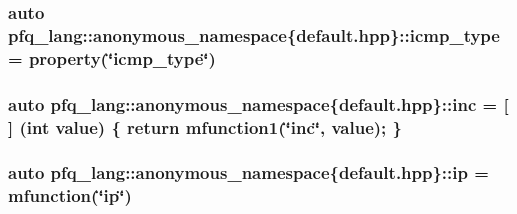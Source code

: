 \hypertarget{namespacepfq__lang_1_1anonymous__namespace_02default_8hpp_03_a4adff7ced08caa2d0016a911dae6d2ed}{
\subsubsection[{icmp\+\_\+type}]{\setlength{\rightskip}{0pt plus 5cm}auto pfq\+\_\+lang\+::anonymous\+\_\+namespace\{default.\+hpp\}\+::icmp\+\_\+type = {\bf property}(\char`\"{}icmp\+\_\+type\char`\"{})}}\label{namespacepfq__lang_1_1anonymous__namespace_02default_8hpp_03_a4adff7ced08caa2d0016a911dae6d2ed}
\hypertarget{namespacepfq__lang_1_1anonymous__namespace_02default_8hpp_03_a14246183085ec07f08ab9b0d53907ae5}{
\subsubsection[{inc}]{\setlength{\rightskip}{0pt plus 5cm}auto pfq\+\_\+lang\+::anonymous\+\_\+namespace\{default.\+hpp\}\+::inc = \mbox{[}$\,$\mbox{]} (int value) \{ return {\bf mfunction1}(\char`\"{}inc\char`\"{}, value); \}}}\label{namespacepfq__lang_1_1anonymous__namespace_02default_8hpp_03_a14246183085ec07f08ab9b0d53907ae5}
\hypertarget{namespacepfq__lang_1_1anonymous__namespace_02default_8hpp_03_a27d30e7744c84a7cdc41a710ee16b885}{
\subsubsection[{ip}]{\setlength{\rightskip}{0pt plus 5cm}auto pfq\+\_\+lang\+::anonymous\+\_\+namespace\{default.\+hpp\}\+::ip = {\bf mfunction}(\char`\"{}ip\char`\"{})}}\label{namespacepfq__lang_1_1anonymous__namespace_02default_8hpp_03_a27d30e7744c84a7cdc41a710ee16b885}
